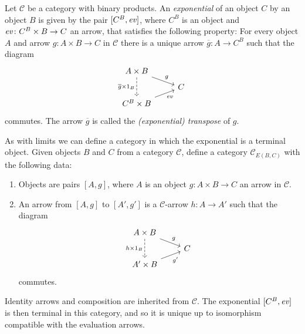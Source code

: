 \documentclass[article, a4paper, 11pt, oneside]{memoir}
\numberwithin{equation}{chapter}
\newcommand{\cat}[1]{\mathcal{#1}}
\newcommand{\catC}{\cat{C}}
\begin{document}
\begin{definition}[Exponentials]
    Let $\catC$ be a category with binary products. An \emph{exponential} of an object $C$ by an object $B$ is given by the pair\footnotemark{} $[C^B, \mathit{ev}]$, where $C^B$ is an object and $\mathit{ev} \colon C^B \times B \to C$ an arrow, that satisfies the following property: For every object $A$ and arrow $g \colon A \times B \to C$ in $\catC$ there is a unique arrow $\overline g \colon A \to C^B$ such that the diagram
    \begin{equation*}
        \begin{tikzcd}[row sep=tiny]
            A \times B
                \ar[dd, "\overline g \times 1_B", swap, dashed]
                \ar[dr, "g"]
            \\
            & C
            \\
            C^B \times B
                \ar[ur, "\eval", swap]
        \end{tikzcd}
    \end{equation*}
    commutes. The arrow $\overline g$ is called the \emph{(exponential) transpose} of $g$.
\end{definition}
%
As with limits we can define a category in which the exponential is a terminal object. Given objects $B$ and $C$ from a category $\catC$, define a category $\catC_{E(B,C)}$ with the following data:
%
\begin{enumerate}
    \item Objects are pairs $[A, g]$, where $A$ is an object $g \colon A \times B \to C$ an arrow in $\catC$.

    \item An arrow from $[A,g]$ to $[A',g']$ is a $\catC$-arrow $h \colon A \to A'$ such that the diagram
    \begin{equation*}
        \begin{tikzcd}[row sep=tiny]
            A \times B
                \ar[dd, "h \times 1_B", swap, dashed]
                \ar[dr, "g"]
            \\
            & C
            \\
            A' \times B
                \ar[ur, "g'", swap]
        \end{tikzcd}
    \end{equation*}
    commutes.
\end{enumerate}
%
Identity arrows and composition are inherited from $\catC$. The exponential $[C^B, \mathit{ev}]$ is then terminal in this category, and so it is unique up to isomorphism compatible with the evaluation arrows.
\end{document}
